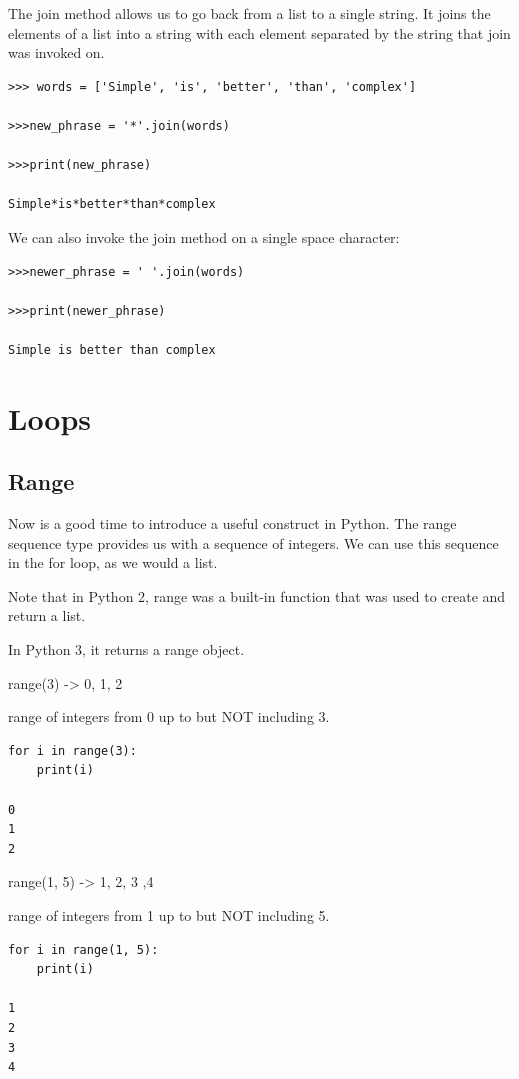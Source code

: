 \documentclass{article}
\begin{document}
The join method allows us to go back from a list to a single string.  It joins the elements of a list into a string with each element separated by the string that join was invoked on. 

\begin{lstlisting}
>>> words = ['Simple', 'is', 'better', 'than', 'complex']

>>>new_phrase = '*'.join(words)

>>>print(new_phrase)

Simple*is*better*than*complex

\end{lstlisting}

We can also invoke the join method on a single space character:

\begin{lstlisting}
>>>newer_phrase = ' '.join(words)

>>>print(newer_phrase)

Simple is better than complex
\end{lstlisting}

\section{Loops}

\subsection{Range}

Now is a good time to introduce a useful construct in Python.  The range sequence type provides us with a sequence of integers.  We can use this sequence in the for loop, as we would a list.

Note that in Python 2, range was a built-in function that was used to create and return a list.

In Python 3, it returns a range object.

range(3) -> 0, 1, 2 

range of integers from 0 up to but NOT including 3.

\begin{lstlisting}
for i in range(3):
    print(i)
 
0
1
2
\end{lstlisting}

range(1, 5) -> 1, 2, 3 ,4 

range of integers from 1 up to but NOT including 5.

\begin{lstlisting}
for i in range(1, 5):
    print(i)
 
1
2
3
4
\end{lstlisting}
\end{document}
